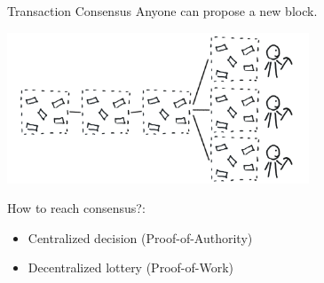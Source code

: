 \documentclass[]{beamer}
\begin{document}
\begin{frame}{Transaction Consensus}
Anyone can propose a new block. \\ \vspace{1.5em}


\includegraphics[width=9cm]{../assets/images/consensus_problem.png}

How to reach consensus?: \\
	\begin{itemize}
	\item Centralized decision (Proof-of-Authority)
	\item \color{focus}Decentralized lottery (Proof-of-Work)
	\end{itemize} 
\end{frame}
\end{document}
